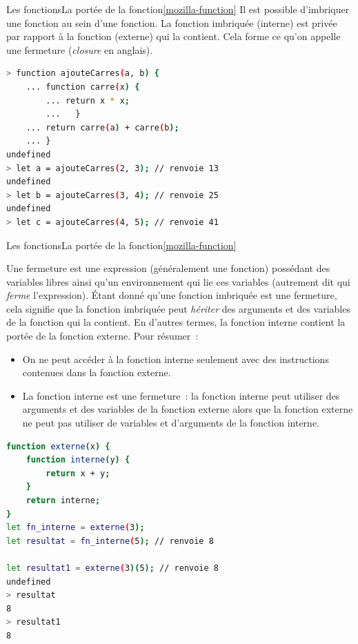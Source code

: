 \documentclass{beamer}
\begin{document}
\begin{frame}[fragile]{Les fonctions}{La portée de la fonction\cref{mozilla-function}}
    Il est possible d'imbriquer une fonction au sein d'une fonction.
    La fonction imbriquée (interne) est privée par rapport à la fonction (externe) qui la contient. Cela forme ce qu'on appelle une fermeture (\textit{closure} en anglais).
    \begin{lstlisting}[language=Bash,title={\scriptsize{Node.js}}]
> function ajouteCarres(a, b) {
    ... function carre(x) {
        ... return x * x;
        ...   }
    ... return carre(a) + carre(b);
    ... }
undefined
> let a = ajouteCarres(2, 3); // renvoie 13
undefined
> let b = ajouteCarres(3, 4); // renvoie 25
undefined
> let c = ajouteCarres(4, 5); // renvoie 41
        \end{lstlisting}
\end{frame}

\begin{frame}[fragile]{Les fonctions}{La portée de la fonction\cref{mozilla-function}}
    \begin{tiny}
        Une fermeture est une expression (généralement une fonction) possédant des variables libres ainsi qu'un environnement qui lie ces variables (autrement dit qui \textit{ferme} l'expression).
        \bigbreak
        Étant donné qu'une fonction imbriquée est une fermeture, cela signifie que la fonction imbriquée peut \textit{hériter} des arguments et des variables de la fonction qui la contient.
        En d'autres termes, la fonction interne contient la portée de la fonction externe.
        \bigbreak
        Pour résumer~:
        \begin{itemize}
            \item On ne peut accéder à la fonction interne seulement avec des instructions
                  contenues dans la fonction externe.
            \item La fonction interne est une fermeture~: la fonction interne peut utiliser des
                  arguments et des variables de la fonction externe alors que la fonction externe
                  ne peut pas utiliser de variables et d'arguments de la fonction interne.
        \end{itemize}
    \end{tiny}
    \begin{lstlisting}[language=Bash,title={\scriptsize{Node.js}}]
function externe(x) {
    function interne(y) {
        return x + y;
    }
    return interne;
}
let fn_interne = externe(3);
let resultat = fn_interne(5); // renvoie 8

let resultat1 = externe(3)(5); // renvoie 8
undefined
> resultat
8
> resultat1
8
        \end{lstlisting}
\end{frame}
\end{document}
